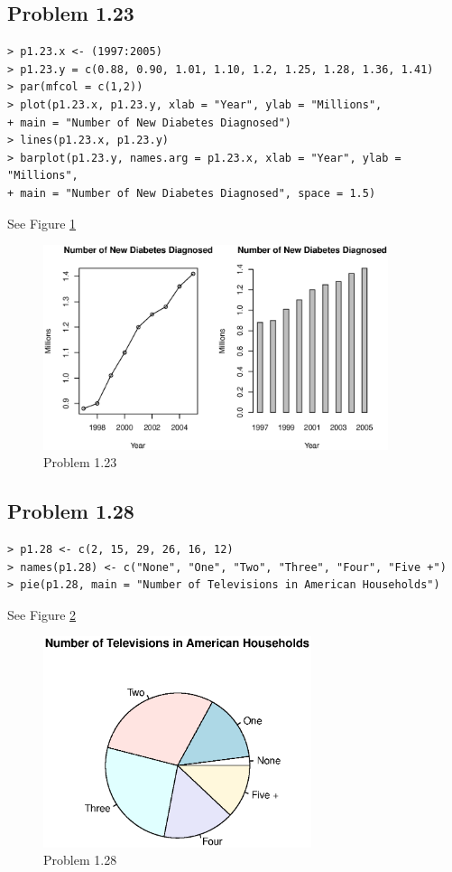 \subsection{Problem 1.23}
\begin{lstlisting}
> p1.23.x <- (1997:2005)
> p1.23.y = c(0.88, 0.90, 1.01, 1.10, 1.2, 1.25, 1.28, 1.36, 1.41)
> par(mfcol = c(1,2))
> plot(p1.23.x, p1.23.y, xlab = "Year", ylab = "Millions",
+ main = "Number of New Diabetes Diagnosed")
> lines(p1.23.x, p1.23.y)
> barplot(p1.23.y, names.arg = p1.23.x, xlab = "Year", ylab = "Millions",
+ main = "Number of New Diabetes Diagnosed", space = 1.5)
\end{lstlisting}
	See Figure \ref{p1.23}
	\begin{figure}[!htb]
	  \centering
	  \includegraphics[width=0.9\textwidth]{p1.23.eps}
	  \caption{Problem 1.23 \label{p1.23}}
	\end{figure}

\subsection{Problem 1.28}
\begin{lstlisting}
> p1.28 <- c(2, 15, 29, 26, 16, 12)
> names(p1.28) <- c("None", "One", "Two", "Three", "Four", "Five +")
> pie(p1.28, main = "Number of Televisions in American Households")
\end{lstlisting}
	See Figure \ref{p1.28}
	\begin{figure}[!htb]
	  \centering
	  \includegraphics[width=0.7\textwidth]{p1.28.eps}
	  \caption{Problem 1.28 \label{p1.28}}
	\end{figure}


